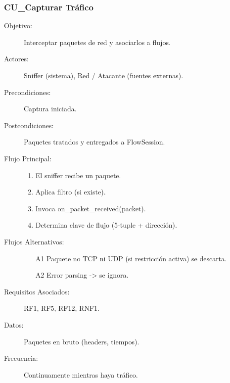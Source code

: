 \subsubsection{CU\_Capturar Tráfico}
\begin{description}
  \item[Objetivo:] Interceptar paquetes de red y asociarlos a flujos.
  \item[Actores:] Sniffer (sistema), Red / Atacante (fuentes externas).
  \item[Precondiciones:] Captura iniciada.
  \item[Postcondiciones:] Paquetes tratados y entregados a FlowSession.
  \item[Flujo Principal:]
    \begin{enumerate}
      \item El sniffer recibe un paquete.
      \item Aplica filtro (si existe).
      \item Invoca on\_packet\_received(packet).
      \item Determina clave de flujo (5-tuple + dirección).
    \end{enumerate}
  \item[Flujos Alternativos:]
    \begin{enumerate}
      \item[A1] Paquete no TCP ni UDP (si restricción activa) se descarta.
      \item[A2] Error parsing -> se ignora.
    \end{enumerate}
  \item[Requisitos Asociados:] RF1, RF5, RF12, RNF1.
  \item[Datos:] Paquetes en bruto (headers, tiempos).
  \item[Frecuencia:] Continuamente mientras haya tráfico.
\end{description}

